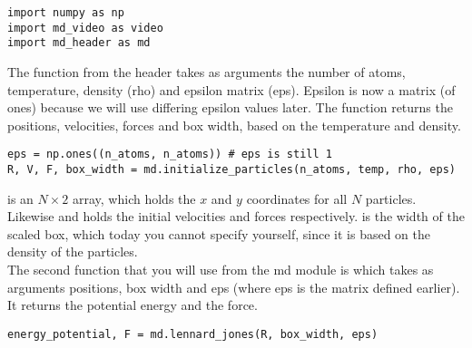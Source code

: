 \documentclass{article}
\begin{document}
\begin{lstlisting}
import numpy as np
import md_video as video
import md_header as md
\end{lstlisting}

The  function from the header takes as arguments
the number of atoms, temperature, density (rho) and epsilon matrix (eps).
Epsilon is now a matrix (of ones) because we will use differing epsilon values later.
The function returns the positions, velocities, forces and box width, based on the temperature and density.

\begin{lstlisting}
eps = np.ones((n_atoms, n_atoms)) # eps is still 1
R, V, F, box_width = md.initialize_particles(n_atoms, temp, rho, eps)
\end{lstlisting}

 is an $N\times2$ array, which holds the $x$ and $y$ coordinates for all $N$ particles.
Likewise  and  holds the initial velocities and forces respectively.
 is the width of the scaled box, which today you cannot specify yourself,
since it is based on the density of the particles.\\


The second function that you will use from the md module is  which takes as arguments positions, box width and eps (where eps is the matrix defined earlier).
It returns the potential energy and the force.

\begin{lstlisting}
energy_potential, F = md.lennard_jones(R, box_width, eps)
\end{lstlisting}
\end{document}
